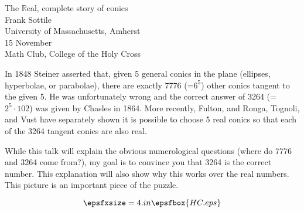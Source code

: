 %
%
%
%


\begin{center}
\Large
The ${\mathbb R}$eal, complete story of conics\\
\large
Frank Sottile\\
University of Massachusetts, Amherst\\
15 November\\
Math Club, College of the Holy Cross
\end{center}

  In 1848 Steiner asserted that, given 5 general conics in the plane
(ellipses, hyperbolae, or parabolae), there are exactly 7776 (=$6^5$) other
conics tangent to the given 5.  He was unfortunately wrong and the correct
answer of 3264 (=$2^5 \cdot 102$) was given by Chasles in 1864.  
More recently,
Fulton, and Ronga, Tognoli, and Vust have separately shown it is possible to
choose 5 real conics so that each of the 3264 tangent conics are also real.

  While this talk will explain the obvious numerological questions (where
do 7776 and 3264 come from?), my goal is to convince you that 3264 is the
correct number. This explanation will also show why this works over the real
numbers.
This picture is an important piece of the puzzle.


$$\epsfxsize=4.in \epsfbox{HC.eps}$$


